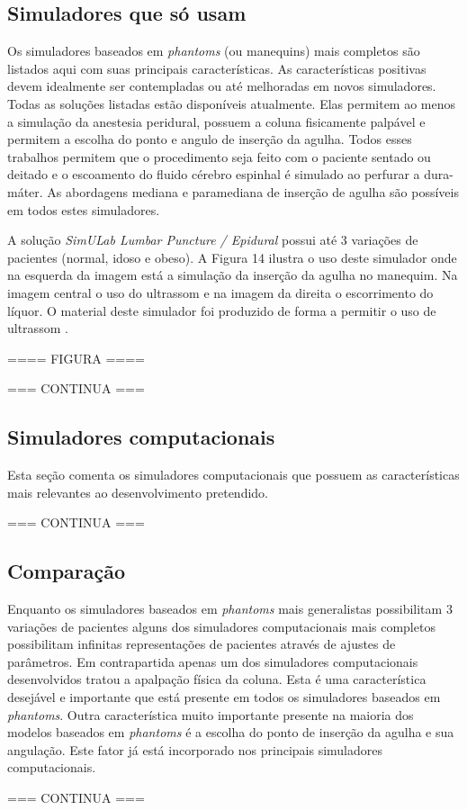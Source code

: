 \subsection {Simuladores que só usam }

Os simuladores baseados em \textit{phantoms} (ou manequins) mais completos são listados aqui com suas principais características. As características positivas devem idealmente ser contempladas ou até melhoradas em novos simuladores. Todas as soluções listadas estão disponíveis atualmente. Elas permitem ao menos a simulação da anestesia peridural, possuem a coluna fisicamente palpável e permitem a escolha do ponto e angulo de inserção da agulha. Todos esses trabalhos permitem que o procedimento seja feito com o paciente sentado ou deitado e o escoamento do fluido cérebro espinhal é simulado ao perfurar a dura-máter. As abordagens mediana e paramediana de inserção de agulha são possíveis em todos estes simuladores.

A solução \textit{SimULab Lumbar Puncture / Epidural} possui até 3 variações de pacientes (normal, idoso e obeso). A Figura 14 ilustra o uso deste simulador onde na esquerda da imagem está a simulação da inserção da agulha no manequim. Na imagem central o uso do ultrassom e na imagem da direita o escorrimento do líquor. O material deste simulador foi produzido de forma a permitir o uso de ultrassom \cite{SimulabCorporation2008}. 

==== FIGURA ====

=== CONTINUA ===

\subsection {Simuladores computacionais}

Esta seção comenta os simuladores computacionais que possuem as características mais relevantes ao desenvolvimento pretendido.

=== CONTINUA ===

\subsection {Comparação}

Enquanto os simuladores baseados em \textit{phantoms} mais generalistas possibilitam 3 variações de pacientes alguns dos simuladores computacionais mais completos possibilitam infinitas representações de pacientes através de ajustes de parâmetros. Em contrapartida apenas um dos simuladores computacionais desenvolvidos tratou a apalpação física da coluna. Esta é uma característica desejável e importante que está presente em todos os simuladores baseados em \textit{phantoms}. Outra característica muito importante presente na maioria dos modelos baseados em \textit{phantoms} é a escolha do ponto de inserção da agulha e sua angulação. Este fator já está incorporado nos principais simuladores computacionais.

=== CONTINUA ===

